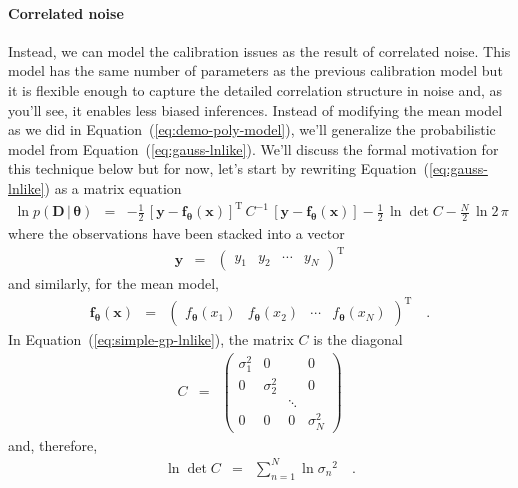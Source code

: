 \documentclass[12pt,preprint]{aastex}
\newcommand{\Eq}[1]{Equation~(\ref{eq:#1})}
\newcommand{\eq}[1]{\Eq{#1}}
\newcommand{\eqlabel}[1]{\label{eq:#1}}
\newcommand{\bvec}[1]{{\ensuremath{\boldsymbol{#1}}}}
\newcommand{\params}{{\ensuremath{\boldsymbol{\theta}}}}
\newcommand{\data}{{\ensuremath{\boldsymbol{D}}}}
\begin{document}
\paragraph{Correlated noise}
Instead, we can model the calibration issues as the result of correlated noise.
This model has the same number of parameters as the previous calibration model
but it is flexible enough to capture the detailed correlation structure in
noise and, as you'll see, it enables less biased inferences.
Instead of modifying the mean model as we did in \eq{demo-poly-model}, we'll
generalize the probabilistic model from \eq{gauss-lnlike}.
We'll discuss the formal motivation for this technique below but for now,
let's start by rewriting \eq{gauss-lnlike} as a matrix equation
\begin{eqnarray}\eqlabel{simple-gp-lnlike}
\ln p (\data\,|\,\params) &=&
-\frac{1}{2}\,\left[\bvec{y}-\bvec{f}_\params(\bvec{x})\right]^\mathrm{T}\,
    C^{-1} \, \left [\bvec{y} - \bvec{f}_\params(\bvec{x}) \right ]
-\frac{1}{2}\,\ln\det C - \frac{N}{2}\,\ln 2\,\pi
\end{eqnarray}
where the observations have been stacked into a vector
\begin{eqnarray}
\bvec{y} &=& \left ( \begin{array}{cccc}
y_1 & y_2 & \cdots & y_N
\end{array} \right )^\mathrm{T}
\end{eqnarray}
and similarly, for the mean model,
\begin{eqnarray}
\bvec{f}_\params(\bvec{x}) &=& \left ( \begin{array}{cccc}
f_\params(x_1) & f_\params(x_2) & \cdots & f_\params(x_N)
\end{array} \right )^\mathrm{T} \quad.
\end{eqnarray}
In \eq{simple-gp-lnlike}, the matrix $C$ is the diagonal
\begin{eqnarray}
C &=& \left (\begin{array}{cccc}
\sigma_1^2 & 0 & & 0 \\
0 & \sigma_2^2 & & 0 \\
& & \ddots & \\
0 & 0 & 0 & \sigma_N^2
\end{array}\right )
\end{eqnarray}
and, therefore,
\begin{eqnarray}
\ln\det C &=& \sum_{n=1}^{N} \ln {\sigma_n}^2 \quad.
\end{eqnarray}
\end{document}
